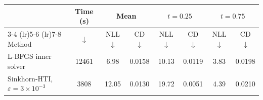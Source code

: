 \begin{tabular}{l c cc cc cc}
\toprule
& Time (s) & \multicolumn{2}{c}{Mean} & \multicolumn{2}{c}{$t=0.25$} & \multicolumn{2}{c}{$t=0.75$} \\
\cmidrule(lr){3-4} \cmidrule(lr){5-6} \cmidrule(lr){7-8}
Method & $\downarrow$ & NLL $\downarrow$ & CD $\downarrow$ & NLL $\downarrow$ & CD $\downarrow$ & NLL $\downarrow$ & CD $\downarrow$ \\
\midrule
L-BFGS inner solver & 12461 & 6.98 & 0.0158 & 10.13 & 0.0119 & 3.83 & 0.0198 \\
Sinkhorn-HTI, $\varepsilon=3\times 10^{-3}$ & 3808 & 12.05 & 0.0130 & 19.72 & 0.0051 & 4.39 & 0.0210 \\
\bottomrule
\end{tabular}
